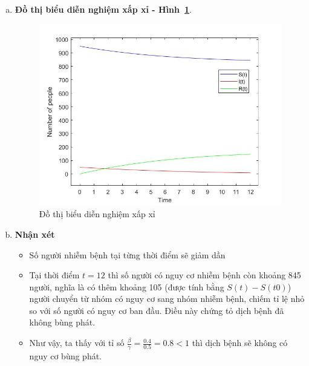 \begin{enumerate}[a)]
\item \textbf{Đồ thị biểu diễn nghiệm xấp xỉ - Hình~\ref{Fig:vd1}}.
	\begin{figure}[h!]
		\begin{center}
		\includegraphics[scale=0.5]{Images/baitoan2/p1.jpg}
		\end{center}
		\caption{Đồ thị biểu diễn nghiệm xấp xỉ }\label{Fig:vd1}
	\end{figure}
	
\item \textbf{Nhận xét}
	\begin{itemize}
		\item Số người nhiễm bệnh tại từng thời điểm sẽ giảm dần
		\item Tại thời điểm $ t = 12 $ thì số người có nguy cơ nhiễm bệnh còn khoảng 845 người, nghĩa là có thêm khoảng 105 (được tính bằng $ S(t)-S(t0) $) người chuyển từ nhóm có nguy cơ sang nhóm nhiễm bệnh, chiếm tỉ lệ nhỏ so với số người có nguy cơ ban đầu. Điều này chứng tỏ dịch bệnh đã không bùng phát.
		\item Như vậy, ta thấy với  tỉ số $ \frac{\beta}{\gamma} = \frac{0.4}{0.5} = 0.8 <1$  thì dịch bệnh sẽ không có nguy cơ bùng phát. 
	\end{itemize}
\end{enumerate}

